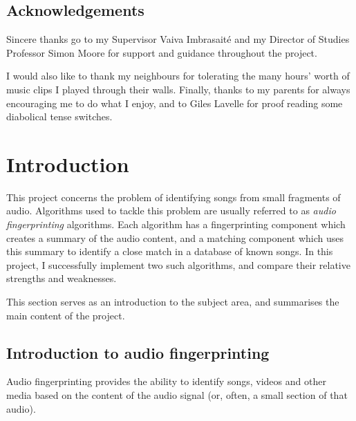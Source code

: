 \documentclass[12pt,a4paper,twoside,openright]{report}
\begin{document}

\newpage
\section*{Acknowledgements}

Sincere thanks go to my Supervisor Vaiva Imbrasait\'{e} and my Director of Studies Professor Simon Moore for support and guidance throughout the project.

I would also like to thank my neighbours for tolerating the many hours' worth of music clips I played through their walls. Finally, thanks to my parents for always encouraging me to do what I enjoy, and to Giles Lavelle for proof reading some diabolical tense switches.


\tableofcontents



\newpage
\pagestyle{headings}


\chapter{Introduction}
\label{introduction}

This project concerns the problem of identifying songs from small fragments of audio. Algorithms used to tackle this problem are usually referred to as \emph{audio fingerprinting} algorithms. Each algorithm has a fingerprinting component which creates a summary of the audio content, and a matching component which uses this summary to identify a close match in a database of known songs. In this project, I successfully implement two such algorithms, and compare their relative strengths and weaknesses.

This section serves as an introduction to the subject area, and summarises the main content of the project.

\section{Introduction to audio fingerprinting}

Audio fingerprinting provides the ability to identify songs, videos and other media based on the content of the audio signal (or, often, a small section of that audio).
\end{document}
